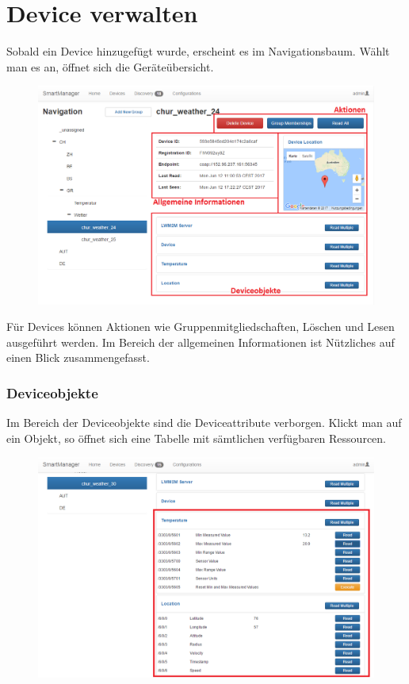 \section{Device verwalten}
Sobald ein Device hinzugefügt wurde, erscheint es im Navigationsbaum. Wählt man es an, öffnet sich die Geräteübersicht.

\begin{figure}[H]
\includegraphics[scale=0.57]{../05_Schlussbericht/images/benutzeranleitung/device_overview.png}
\end{figure} 

Für Devices können Aktionen wie Gruppenmitgliedschaften, Löschen und Lesen ausgeführt werden. Im Bereich der allgemeinen Informationen ist Nützliches auf einen Blick zusammengefasst.
\newpage

\subsubsection{Deviceobjekte}
Im Bereich der Deviceobjekte sind die Deviceattribute verborgen. Klickt man auf ein Objekt, so öffnet sich eine Tabelle mit sämtlichen verfügbaren Ressourcen.
\begin{figure}[H]
\includegraphics[scale=0.57]{../05_Schlussbericht/images/benutzeranleitung/devicefragment.png}
\end{figure}

